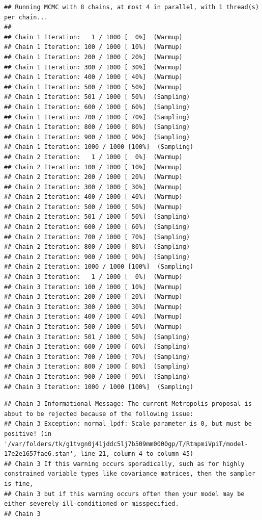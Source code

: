 \documentclass[
]{book}
\begin{document}
\begin{verbatim}
## Running MCMC with 8 chains, at most 4 in parallel, with 1 thread(s) per chain...
## 
## Chain 1 Iteration:   1 / 1000 [  0%]  (Warmup) 
## Chain 1 Iteration: 100 / 1000 [ 10%]  (Warmup) 
## Chain 1 Iteration: 200 / 1000 [ 20%]  (Warmup) 
## Chain 1 Iteration: 300 / 1000 [ 30%]  (Warmup) 
## Chain 1 Iteration: 400 / 1000 [ 40%]  (Warmup) 
## Chain 1 Iteration: 500 / 1000 [ 50%]  (Warmup) 
## Chain 1 Iteration: 501 / 1000 [ 50%]  (Sampling) 
## Chain 1 Iteration: 600 / 1000 [ 60%]  (Sampling) 
## Chain 1 Iteration: 700 / 1000 [ 70%]  (Sampling) 
## Chain 1 Iteration: 800 / 1000 [ 80%]  (Sampling) 
## Chain 1 Iteration: 900 / 1000 [ 90%]  (Sampling) 
## Chain 1 Iteration: 1000 / 1000 [100%]  (Sampling) 
## Chain 2 Iteration:   1 / 1000 [  0%]  (Warmup) 
## Chain 2 Iteration: 100 / 1000 [ 10%]  (Warmup) 
## Chain 2 Iteration: 200 / 1000 [ 20%]  (Warmup) 
## Chain 2 Iteration: 300 / 1000 [ 30%]  (Warmup) 
## Chain 2 Iteration: 400 / 1000 [ 40%]  (Warmup) 
## Chain 2 Iteration: 500 / 1000 [ 50%]  (Warmup) 
## Chain 2 Iteration: 501 / 1000 [ 50%]  (Sampling) 
## Chain 2 Iteration: 600 / 1000 [ 60%]  (Sampling) 
## Chain 2 Iteration: 700 / 1000 [ 70%]  (Sampling) 
## Chain 2 Iteration: 800 / 1000 [ 80%]  (Sampling) 
## Chain 2 Iteration: 900 / 1000 [ 90%]  (Sampling) 
## Chain 2 Iteration: 1000 / 1000 [100%]  (Sampling) 
## Chain 3 Iteration:   1 / 1000 [  0%]  (Warmup) 
## Chain 3 Iteration: 100 / 1000 [ 10%]  (Warmup) 
## Chain 3 Iteration: 200 / 1000 [ 20%]  (Warmup) 
## Chain 3 Iteration: 300 / 1000 [ 30%]  (Warmup) 
## Chain 3 Iteration: 400 / 1000 [ 40%]  (Warmup) 
## Chain 3 Iteration: 500 / 1000 [ 50%]  (Warmup) 
## Chain 3 Iteration: 501 / 1000 [ 50%]  (Sampling) 
## Chain 3 Iteration: 600 / 1000 [ 60%]  (Sampling) 
## Chain 3 Iteration: 700 / 1000 [ 70%]  (Sampling) 
## Chain 3 Iteration: 800 / 1000 [ 80%]  (Sampling) 
## Chain 3 Iteration: 900 / 1000 [ 90%]  (Sampling) 
## Chain 3 Iteration: 1000 / 1000 [100%]  (Sampling)
\end{verbatim}

\begin{verbatim}
## Chain 3 Informational Message: The current Metropolis proposal is about to be rejected because of the following issue:
## Chain 3 Exception: normal_lpdf: Scale parameter is 0, but must be positive! (in '/var/folders/tk/g1tvgn0j41jddc5lj7b509mm0000gp/T/RtmpmiVpiT/model-17e2e1657fae6.stan', line 21, column 4 to column 45)
## Chain 3 If this warning occurs sporadically, such as for highly constrained variable types like covariance matrices, then the sampler is fine,
## Chain 3 but if this warning occurs often then your model may be either severely ill-conditioned or misspecified.
## Chain 3
\end{verbatim}
\end{document}
